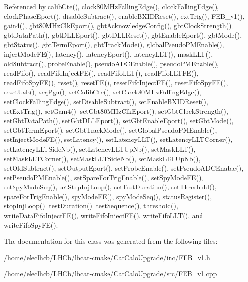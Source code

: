 Referenced by calib\+Cte(), clock80\+M\+Hz\+Falling\+Edge(), clock\+Falling\+Edge(), clock\+Phase\+Eport(), disable\+Subtract(), enable\+B\+X\+I\+D\+Reset(), ext\+Trig(), F\+E\+B\+\_\+v1(), gain4(), gbt80\+M\+Hz\+Clk\+Eport(), gbt\+Acknowledge\+Config(), gbt\+Clock\+Strength(), gbt\+Data\+Path(), gbt\+D\+L\+L\+Eport(), gbt\+D\+L\+L\+Reset(), gbt\+Enable\+Eport(), gbt\+Mode(), gbt\+Status(), gbt\+Term\+Eport(), gbt\+Track\+Mode(), global\+Pseudo\+P\+M\+Enable(), inject\+Mode\+F\+E(), latency(), latency\+Eport(), latency\+L\+L\+T(), mask\+L\+L\+T(), old\+Subtract(), probe\+Enable(), pseudo\+A\+D\+C\+Enable(), pseudo\+P\+M\+Enable(), read\+Fifo(), read\+Fifo\+Inject\+F\+E(), read\+Fifo\+L\+L\+T(), read\+Fifo\+L\+L\+T\+F\+E(), read\+Fifo\+Spy\+F\+E(), reset(), reset\+F\+E(), reset\+Fifo\+Inject\+F\+E(), reset\+Fifo\+Spy\+F\+E(), reset\+Usb(), seq\+Pga(), set\+Calib\+Cte(), set\+Clock80\+M\+Hz\+Falling\+Edge(), set\+Clock\+Falling\+Edge(), set\+Disable\+Subtract(), set\+Enable\+B\+X\+I\+D\+Reset(), set\+Ext\+Trig(), set\+Gain4(), set\+Gbt80\+M\+Hz\+Clk\+Eport(), set\+Gbt\+Clock\+Strength(), set\+Gbt\+Data\+Path(), set\+Gbt\+D\+L\+L\+Eport(), set\+Gbt\+Enable\+Eport(), set\+Gbt\+Mode(), set\+Gbt\+Term\+Eport(), set\+Gbt\+Track\+Mode(), set\+Global\+Pseudo\+P\+M\+Enable(), set\+Inject\+Mode\+F\+E(), set\+Latency(), set\+Latency\+L\+L\+T(), set\+Latency\+L\+L\+T\+Corner(), set\+Latency\+L\+L\+T\+Side\+Nb(), set\+Latency\+L\+L\+T\+Up\+Nb(), set\+Mask\+L\+L\+T(), set\+Mask\+L\+L\+T\+Corner(), set\+Mask\+L\+L\+T\+Side\+Nb(), set\+Mask\+L\+L\+T\+Up\+Nb(), set\+Old\+Subtract(), set\+Output\+Eport(), set\+Probe\+Enable(), set\+Pseudo\+A\+D\+C\+Enable(), set\+Pseudo\+P\+M\+Enable(), set\+Spare\+For\+Trig\+Enable(), set\+Spy\+Mode\+F\+E(), set\+Spy\+Mode\+Seq(), set\+Stop\+Inj\+Loop(), set\+Test\+Duration(), set\+Threshold(), spare\+For\+Trig\+Enable(), spy\+Mode\+F\+E(), spy\+Mode\+Seq(), status\+Register(), stop\+Inj\+Loop(), test\+Duration(), test\+Sequence(), threshold(), write\+Data\+Fifo\+Inject\+F\+E(), write\+Fifo\+Inject\+F\+E(), write\+Fifo\+L\+L\+T(), and write\+Fifo\+Spy\+F\+E().



The documentation for this class was generated from the following files\+:\begin{DoxyCompactItemize}
\item 
/home/eleclhcb/\+L\+H\+Cb/lbcat-\/cmake/\+Cat\+Calo\+Upgrade/inc/\hyperlink{FEB__v1_8h}{F\+E\+B\+\_\+v1.\+h}\item 
/home/eleclhcb/\+L\+H\+Cb/lbcat-\/cmake/\+Cat\+Calo\+Upgrade/src/\hyperlink{FEB__v1_8cpp}{F\+E\+B\+\_\+v1.\+cpp}\end{DoxyCompactItemize}
